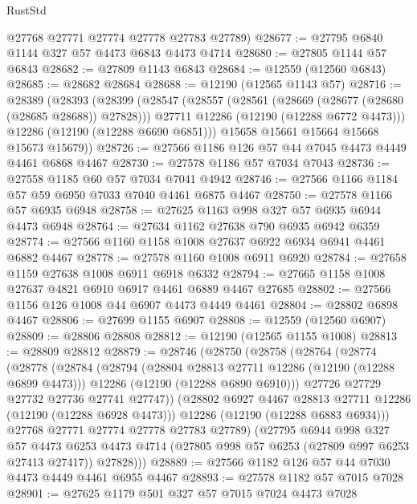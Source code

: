 \begin{lexlean}{RustStd}
\begin{coremodule}
      @27768
      @27771
      @27774
      @27778
      @27783
      @27789)
@28677 := @27795 @6840 @1144 @327 @57 @4473 @6843 @4473 @4714
@28680 := @27805 @1144 @57 @6843
@28682 := @27809 @1143 @6843
@28684 := @12559 (@12560 @6843)
@28685 := @28682 @28684
@28688 := @12190 (@12565 @1143 @57)
@28716 := @28389
    (@28393
      (@28399
        (@28547
          (@28557
            (@28561 (@28669 (@28677 (@28680 (@28685 @28688)) @27828)))
            @27711
            @12286
            (@12190 (@12288 @6772 @4473)))
          @12286
          (@12190 (@12288 @6690 @6851)))
        @15658
        @15661
        @15664
        @15668
        @15673
        @15679))
@28726 := @27566 @1186 @126 @57 @44 @7045 @4473 @4449 @4461 @6868 @4467
@28730 := @27578 @1186 @57 @7034 @7043
@28736 := @27558 @1185 @60 @57 @7034 @7041 @4942
@28746 := @27566 @1166 @1184 @57 @59 @6950 @7033 @7040 @4461 @6875 @4467
@28750 := @27578 @1166 @57 @6935 @6948
@28758 := @27625 @1163 @998 @327 @57 @6935 @6944 @4473 @6948
@28764 := @27634 @1162 @27638 @790 @6935 @6942 @6359
@28774 := @27566 @1160 @1158 @1008 @27637 @6922 @6934 @6941 @4461 @6882 @4467
@28778 := @27578 @1160 @1008 @6911 @6920
@28784 := @27658 @1159 @27638 @1008 @6911 @6918 @6332
@28794 := @27665 @1158 @1008 @27637 @4821 @6910 @6917 @4461 @6889 @4467 @27685
@28802 := @27566 @1156 @126 @1008 @44 @6907 @4473 @4449 @4461
@28804 := @28802 @6898 @4467
@28806 := @27699 @1155 @6907
@28808 := @12559 (@12560 @6907)
@28809 := @28806 @28808
@28812 := @12190 (@12565 @1155 @1008)
@28813 := @28809 @28812
@28879 := @28746
    (@28750
      (@28758
        (@28764
          (@28774
            (@28778
              (@28784
                (@28794
                  (@28804 @28813 @27711 @12286 (@12190 (@12288 @6899 @4473)))
                  @12286
                  (@12190 (@12288 @6890 @6910)))
                @27726
                @27729
                @27732
                @27736
                @27741
                @27747))
            (@28802 @6927 @4467 @28813 @27711 @12286 (@12190 (@12288 @6928 @4473)))
            @12286
            (@12190 (@12288 @6883 @6934)))
          @27768
          @27771
          @27774
          @27778
          @27783
          @27789)
        (@27795
          @6944
          @998
          @327
          @57
          @4473
          @6253
          @4473
          @4714
          (@27805 @998 @57 @6253 (@27809 @997 @6253 @27413 @27417))
          @27828)))
@28889 := @27566 @1182 @126 @57 @44 @7030 @4473 @4449 @4461 @6955 @4467
@28893 := @27578 @1182 @57 @7015 @7028
@28901 := @27625 @1179 @501 @327 @57 @7015 @7024 @4473 @7028

\end{coremodule}
\end{lexlean}
